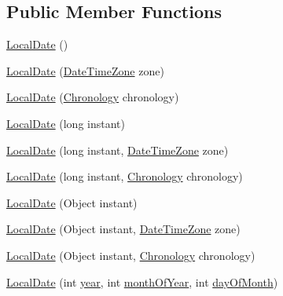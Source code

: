 \subsection*{Public Member Functions}
\begin{DoxyCompactItemize}
\item 
\hyperlink{classorg_1_1joda_1_1time_1_1_local_date_a94499d1dedf23972126ba86ce8f15237}{Local\-Date} ()
\item 
\hyperlink{classorg_1_1joda_1_1time_1_1_local_date_ac5a819d4894d24fc764cbf026dc1d65a}{Local\-Date} (\hyperlink{classorg_1_1joda_1_1time_1_1_date_time_zone}{Date\-Time\-Zone} zone)
\item 
\hyperlink{classorg_1_1joda_1_1time_1_1_local_date_a65ff9505480b69789373f56eefc86e83}{Local\-Date} (\hyperlink{classorg_1_1joda_1_1time_1_1_chronology}{Chronology} chronology)
\item 
\hyperlink{classorg_1_1joda_1_1time_1_1_local_date_aa3fcbb3d8743fd818136d66f5ca29088}{Local\-Date} (long instant)
\item 
\hyperlink{classorg_1_1joda_1_1time_1_1_local_date_ac84aa5a139c37cc7728c5ae0601a8564}{Local\-Date} (long instant, \hyperlink{classorg_1_1joda_1_1time_1_1_date_time_zone}{Date\-Time\-Zone} zone)
\item 
\hyperlink{classorg_1_1joda_1_1time_1_1_local_date_aa17942a964811e08459f388f9deba303}{Local\-Date} (long instant, \hyperlink{classorg_1_1joda_1_1time_1_1_chronology}{Chronology} chronology)
\item 
\hyperlink{classorg_1_1joda_1_1time_1_1_local_date_a895305e2eb872697ce244be2c7d2f1e9}{Local\-Date} (Object instant)
\item 
\hyperlink{classorg_1_1joda_1_1time_1_1_local_date_a7da411e900b6a3e34633bd49487006a5}{Local\-Date} (Object instant, \hyperlink{classorg_1_1joda_1_1time_1_1_date_time_zone}{Date\-Time\-Zone} zone)
\item 
\hyperlink{classorg_1_1joda_1_1time_1_1_local_date_afbdff4241e7b1881d5946372e224a645}{Local\-Date} (Object instant, \hyperlink{classorg_1_1joda_1_1time_1_1_chronology}{Chronology} chronology)
\item 
\hyperlink{classorg_1_1joda_1_1time_1_1_local_date_aafe77556c2f4283dabb620f8503f5d2e}{Local\-Date} (int \hyperlink{classorg_1_1joda_1_1time_1_1_local_date_a0bae1887eb2fa9df0d965988d04a37de}{year}, int \hyperlink{classorg_1_1joda_1_1time_1_1_local_date_a00923ad74b6ab2f01e45d3f4804f15f7}{month\-Of\-Year}, int \hyperlink{classorg_1_1joda_1_1time_1_1_local_date_a876472f9f0711437971e9b5c029b7474}{day\-Of\-Month})

\end{DoxyCompactItemize}
